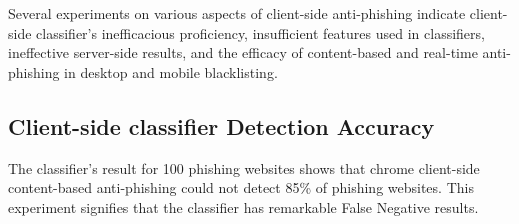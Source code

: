\documentclass[letterpaper,twocolumn,10pt]{article}
\begin{document}
Several experiments on various aspects of client-side anti-phishing indicate client-side classifier's inefficacious proficiency, insufficient features used in classifiers, ineffective server-side results, and the efficacy of content-based and real-time anti-phishing in desktop and mobile blacklisting.

\subsection{ Client-side classifier Detection Accuracy }




The classifier's result for 100 phishing websites shows that chrome client-side content-based anti-phishing could not detect 85\%  of phishing websites. This experiment signifies that the classifier has remarkable False Negative results. 
\begin{table}[]
\caption{Client-side and server-side detection ratio}
\label{tab: Client -side and server-side}
\end{table}
\end{document}
